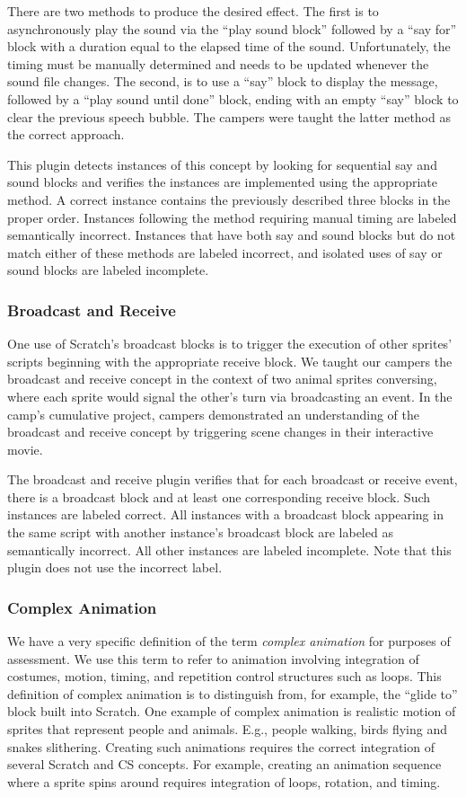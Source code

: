 There are two methods to produce the desired effect.  The first is to
asynchronously play the sound via the ``play sound block'' followed by a ``say
for'' block with a duration equal to the elapsed time of the sound.
Unfortunately, the timing must be manually determined and needs to be updated
whenever the sound file changes.  The second, is to use a ``say'' block to
display the message, followed by a ``play sound until done'' block, ending with
an empty ``say'' block to clear the previous speech bubble. The campers were
taught the latter method as the correct approach.

This plugin detects instances of this concept by looking for sequential say and
sound blocks and verifies the instances are implemented using the appropriate
method.  A correct instance contains the previously described three blocks in
the proper order.  Instances following the method requiring manual timing are
labeled semantically incorrect. Instances that have both say and sound blocks
but do not match either of these methods are labeled incorrect, and isolated
uses of say or sound blocks are labeled incomplete.


\subsubsection*{Broadcast and Receive}
One use of Scratch's broadcast blocks is to trigger the execution of other
sprites' scripts beginning with the appropriate receive block. We taught our
campers the broadcast and receive concept in the context of two animal sprites
conversing, where each sprite would signal the other's turn via broadcasting an
event. In the camp's cumulative project, campers demonstrated an understanding
of the broadcast and receive concept by triggering scene changes in their
interactive movie.

The broadcast and receive plugin verifies that for each broadcast or receive
event, there is a broadcast block and at least one corresponding receive
block. Such instances are labeled correct. All instances with a broadcast block
appearing in the same script with another instance's broadcast block are
labeled as semantically incorrect. All other instances are labeled
incomplete. Note that this plugin does not use the incorrect label.

\subsubsection*{Complex Animation}
We have a very specific definition of the term {\em complex animation} for
purposes of assessment.  We use this term to refer to animation involving
integration of costumes, motion, timing, and repetition control structures such
as loops. This definition of complex animation is to distinguish from, for
example, the ``glide to'' block built into Scratch.  One example of complex
animation is realistic motion of sprites that represent people and
animals. E.g., people walking, birds flying and snakes slithering.  Creating
such animations requires the correct integration of several Scratch and CS
concepts.  For example, creating an animation sequence where a sprite spins
around requires integration of loops, rotation, and timing.

